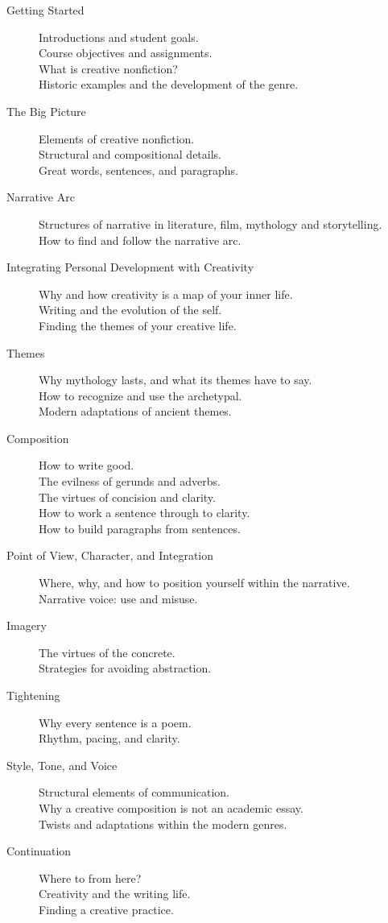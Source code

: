 \documentclass[letterpaper,10pt,headsepline]{scrreprt}
\begin{document}
\begin{description}
\item[Getting Started] Introductions and student goals.\\
  Course objectives and assignments.\\
  What is creative nonfiction?\\
  Historic examples and the development of the genre.
\item[The Big Picture] Elements of creative nonfiction.\\
  Structural and compositional details.\\
  Great words, sentences, and paragraphs.
\item[Narrative Arc] Structures of narrative in literature, film,
  mythology and storytelling.\\
  How to find and follow the narrative arc.
\item[Integrating Personal Development with Creativity] Why and how
  creativity is a map of your inner life.\\
  Writing and the evolution of the self.\\
  Finding the themes of your creative life.
\item[Themes] Why mythology lasts, and what its themes have to say.\\
  How to recognize and use the archetypal.\\
  Modern adaptations of ancient themes.
\item[Composition] How to write good.\\
  The evilness of gerunds and adverbs.\\
  The virtues of concision and clarity.\\
  How to work a sentence through to clarity.\\
  How to build paragraphs from sentences.
\item[Point of View, Character, and Integration] Where, why, and how
  to position yourself within the narrative.\\
  Narrative voice: use and misuse.
\item[Imagery] The virtues of the concrete.\\
Strategies for avoiding abstraction.
\item[Tightening] Why every sentence is a poem.\\
Rhythm, pacing, and clarity.
\item[Style, Tone, and Voice] Structural elements of communication.\\
  Why a creative composition is not an academic essay.\\
  Twists and adaptations within the modern genres.
\item[Continuation] Where to from here?\\
Creativity and the writing life.\\
Finding a creative practice.
\end{description}
\newpage
\end{document}
